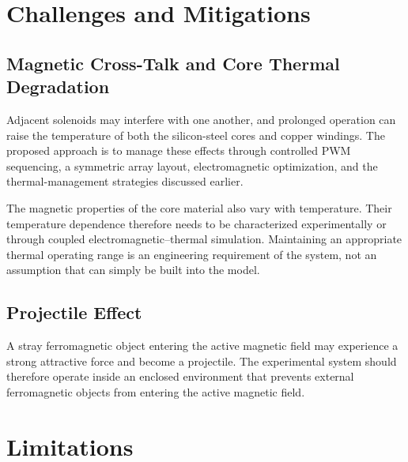 \documentclass[12pt, a4paper]{article}
\begin{document}
\section{Challenges and Mitigations}

\subsection{Magnetic Cross-Talk and Core Thermal Degradation}

Adjacent solenoids may interfere with one another, and prolonged operation can raise the temperature of both the silicon-steel cores and copper windings. The proposed approach is to manage these effects through controlled PWM sequencing, a symmetric array layout, electromagnetic optimization, and the thermal-management strategies discussed earlier.

The magnetic properties of the core material also vary with temperature. Their temperature dependence therefore needs to be characterized experimentally or through coupled electromagnetic--thermal simulation. Maintaining an appropriate thermal operating range is an engineering requirement of the system, not an assumption that can simply be built into the model.

\subsection{Projectile Effect}

A stray ferromagnetic object entering the active magnetic field may experience a strong attractive force and become a projectile. The experimental system should therefore operate inside an enclosed environment that prevents external ferromagnetic objects from entering the active magnetic field.

\section{Limitations}
\end{document}
